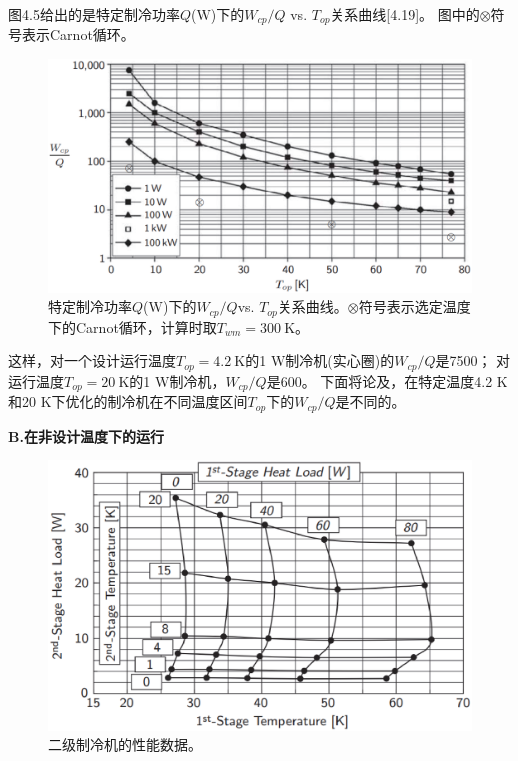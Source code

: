 图4.5给出的是特定制冷功率$Q$($\mathrm{W}$)下的$W_{cp}/Q$ vs. $T_{op}$关系曲线[4.19]。
图中的$\otimes$符号表示Carnot循环。
\begin{figure}[htbp]
	\centering
	\includegraphics[scale=0.45]{chpt4/figs/fig4.5.eps}
	\caption{特定制冷功率$Q$($\mathrm{W}$)下的$W_{cp}/Q$vs. $T_{op}$关系曲线。$\otimes$符号表示选定温度下的Carnot循环，计算时取$T_{wm}=300\ \mathrm{K}$。}
\end{figure}

这样，对一个设计运行温度$T_{op}=4.2\ \mathrm{K}$的1 W制冷机(实心圈)的$W_{cp}/Q$是7500；
对运行温度$T_{op}=20\ \mathrm{K}$的1 W制冷机，$W_{cp}/Q$是600。
下面将论及，在特定温度4.2 K和20 K下优化的制冷机在不同温度区间$T_{op}$下的$W_{cp}/Q$是不同的。

\textbf{B.在非设计温度下的运行}

\begin{figure}[htbp]
	\centering
	\includegraphics[scale=0.5]{chpt4/figs/fig4.6.eps}
	\caption{二级制冷机的性能数据。}
\end{figure}

